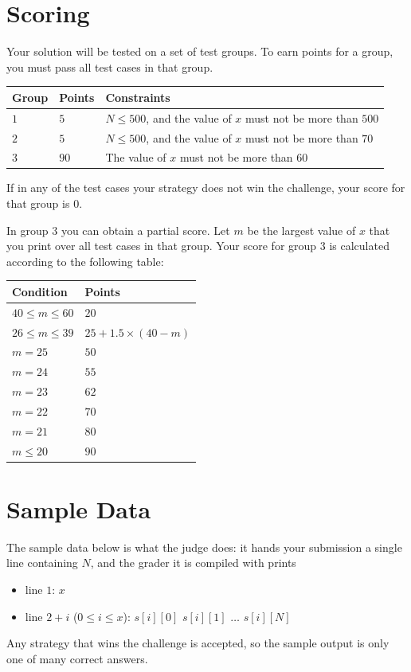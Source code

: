 \section*{Scoring}
Your solution will be tested on a set of test groups.
To earn points for a group, you must pass all test cases in that group.

\noindent
\begin{tabular}{| l | l | p{12cm} |}
  \hline
  \textbf{Group} & \textbf{Points} & \textbf{Constraints} \\ \hline
  $1$ & $5$  & $N \leq 500$, and the value of $x$ must not be more than $500$ \\ \hline
  $2$ & $5$  & $N \leq 500$, and the value of $x$ must not be more than $70$ \\ \hline
  $3$ & $90$ & The value of $x$ must not be more than $60$ \\ \hline
\end{tabular}

\medskip
\noindent
If in any of the test cases your strategy does not win the challenge, your score for that group is
$0$.

In group $3$ you can obtain a partial score. Let $m$ be the largest value of $x$ that you print over
all test cases in that group. Your score for group $3$ is calculated according to the following table:

\begin{center}
\begin{tabular}{| l | l |}
  \hline
  \textbf{Condition} & \textbf{Points} \\ \hline
  $40 \leq m \leq 60$    & $20$ \\ \hline
  $26 \leq m \leq 39$    & $25 + 1.5 \times (40 - m)$ \\ \hline
  $m = 25$               & $50$ \\ \hline
  $m = 24$               & $55$ \\ \hline
  $m = 23$               & $62$ \\ \hline
  $m = 22$               & $70$ \\ \hline
  $m = 21$               & $80$ \\ \hline
  $m \leq 20$            & $90$ \\ \hline
\end{tabular}
\end{center}

\section*{Sample Data}
The sample data below is what the judge does: it hands your submission a single line containing $N$,
and the grader it is compiled with prints
\begin{itemize}
  \item line $1$: $x$
  \item line $2 + i$ ($0 \leq i \leq x$): $s[i][0]$ $s[i][1]$ $\ldots$ $s[i][N]$
\end{itemize}
Any strategy that wins the challenge is accepted, so the sample output is only one of many correct
answers.

